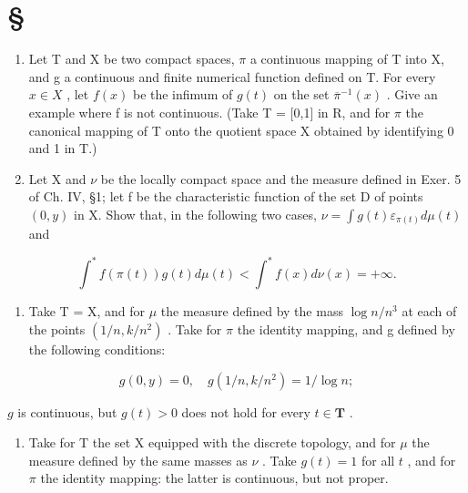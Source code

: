 \section*{\texorpdfstring{\S\CurrentExerciseGroup}{Section \CurrentExerciseGroup}}
{}

\begin{enumerate}
\def\labelenumi{\arabic{enumi})}
\item
  Let T and X be two compact spaces, \(\pi\) a continuous mapping of T into X, and g a continuous and finite numerical function defined on T. For every \(x \in X\) , let \(f(x)\) be the infimum of \(g(t)\) on the set \(\overline{\pi}^{-1}(x)\) . Give an example where f is not continuous. (Take T = {[}0,1{]} in R, and for \(\pi\) the canonical mapping of T onto the quotient space X obtained by identifying 0 and 1 in T.)
\item
  Let X and \(\nu\) be the locally compact space and the measure defined in Exer. 5 of Ch. IV, §1; let f be the characteristic function of the set D of points \((0,y)\) in X. Show that, in the following two cases, \(\nu=\int g(t)\varepsilon_{\pi(t)}d\mu(t)\) and
\end{enumerate}

\[
\int^ {*} f (\pi (t)) g (t) d \mu (t) <   \int^ {*} f (x) d \nu (x) = + \infty .
\]

\begin{enumerate}
\def\labelenumi{\alph{enumi})}
\tightlist
\item
  Take T = X, and for \(\mu\) the measure defined by the mass \(\log n/n^{3}\) at each of the points \((1/n, k/n^{2})\) . Take for \(\pi\) the identity mapping, and g defined by the following conditions:
\end{enumerate}

\[
g (0, y) = 0, \quad g (1 / n, k / n ^ {2}) = 1 / \log n;
\]

\(g\) is continuous, but \(g(t) > 0\) does not hold for every \(t \in \mathbf{T}\) .

\begin{enumerate}
\def\labelenumi{\alph{enumi})}
\setcounter{enumi}{1}
\tightlist
\item
  Take for T the set X equipped with the discrete topology, and for \(\mu\) the measure defined by the same masses as \(\nu\) . Take \(g(t) = 1\) for all \(t\) , and for \(\pi\) the identity mapping: the latter is continuous, but not proper.
\end{enumerate}
\relax{}
\setcounter{exercisegroup}{5}
\edef\CurrentExerciseGroup{\arabic{exercisegroup}}
